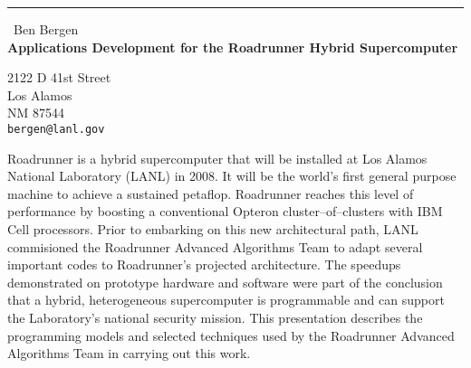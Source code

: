 \documentclass{report}
\begin{document}
\begin{center}
\rule{6in}{1pt} \
{\large Ben Bergen \\
{\bf Applications Development for the Roadrunner Hybrid Supercomputer}}

2122 D 41st Street \\ Los Alamos \\ NM 87544
\\
{\tt bergen@lanl.gov}\end{center}

Roadrunner is a hybrid supercomputer that will be installed at Los Alamos
National Laboratory (LANL) in 2008. It will be the world's first general
purpose machine to achieve a sustained petaflop. Roadrunner reaches this
level of performance by boosting a conventional Opteron
cluster--of--clusters with IBM Cell processors. Prior to embarking on
this new architectural path, LANL commisioned the Roadrunner Advanced
Algorithms Team to adapt several important codes to Roadrunner's
projected architecture. The speedups demonstrated on prototype hardware
and software were part of the conclusion that a hybrid, heterogeneous
supercomputer is programmable and can support the Laboratory's national
security mission. This presentation describes the programming models and
selected techniques used by the Roadrunner Advanced Algorithms Team in
carrying out this work.
\end{document}
